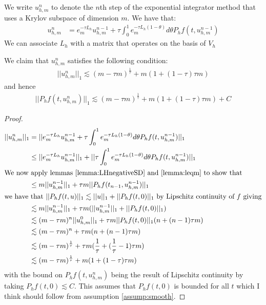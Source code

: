 \begin{definition}
    We write $u_{h,m}^n$ to denote the $n$th step of the exponential integrator method that uses a Krylov subspace of dimension $m$.
    We have that:
    \begin{align*}
        u_{h,m}^n &= e_m^{-\tau L_h} u_{h,m}^{n-1} + \tau \int^1_0e_m^{-\tau L_h(1-\theta)}d\theta P_hf(t, u_{h,m}^{n-1})
    \end{align*}
    We can associate $L_h$ with a matrix that operates on the basis of $V_h$
\end{definition}

\begin{lemma}
    We claim that $u_{h,m}^n$ satisfies the following condition:
    \begin{align*}
        ||u_{h,m}^n||_1 \lesssim (m-\tau m)^\frac{1}{\tau} + m (1 + (1 - \tau)\tau m)
    \end{align*}
    and hence
    \begin{align*}
        ||P_hf(t,u_{h,m}^n)||_1 \lesssim (m-\tau m)^\frac{1}{\tau} + m (1 + (1 - \tau)\tau m) + C
    \end{align*}
\end{lemma}
\begin{proof}
    \begin{align*}
        ||u_{h,m}^n||_1 &= ||e_m^{-\tau L_h}u_{h,m}^{n-1} + \tau \int^1_0e_m^{-\tau L_h(1-\theta)}d\theta P_hf(t, u_{h,m}^{n-1})||_1\\
        &\leq ||e_m^{-\tau L_h}u_{h,m}^{n-1}||_1 + ||\tau \int^1_0e_m^{-\tau L_h(1-\theta)}d\theta P_hf(t, u_{h,m}^{n-1})||_1\\
        \intertext{We now apply lemmas \ref{lemma:LHnegativeSD} and \ref{lemma:leqm} to show that}
        &\leq m||u_{h,m}^{n-1}||_1 + \tau m ||P_hf(t_{n-1},u_{h,m}^{n-1})||_1\\
        \intertext{we have that $||P_hf(t,u)||_1 \lesssim ||u||_1+||P_hf(t,0)||_1$ by Lipschitz continuity of $f$ giving}
        &\lesssim m||u_{h,m}^{n-1}||_1 + \tau m (||u_{h,m}^{n-1}||_1 + ||P_hf(t,0)||_1)\\
        &\lesssim (m-\tau m)^n||u_{h,m}^0||_1 + \tau m ||P_hf(t,0)||_1(n + (n -1)\tau m)\\
        &\lesssim (m-\tau m)^n + \tau m (n + (n -1)\tau m)\\
        &\lesssim (m-\tau m)^\frac{1}{\tau} + \tau m (\frac{1}{\tau} + (\frac{1}{\tau} -1)\tau m)\\
        &\lesssim (m-\tau m)^\frac{1}{\tau} + m (1 + (1 - \tau)\tau m)
    \end{align*}
    with the bound on $P_hf(t,u_{h,m}^n)$ being the result of Lipschitz continuity by taking $P_hf(t,0)\lesssim C$.
    This assumes that $P_hf(t,0)$ is bounded for all $t$ which I think should follow from assumption \ref{assump:smooth}.
\end{proof}
